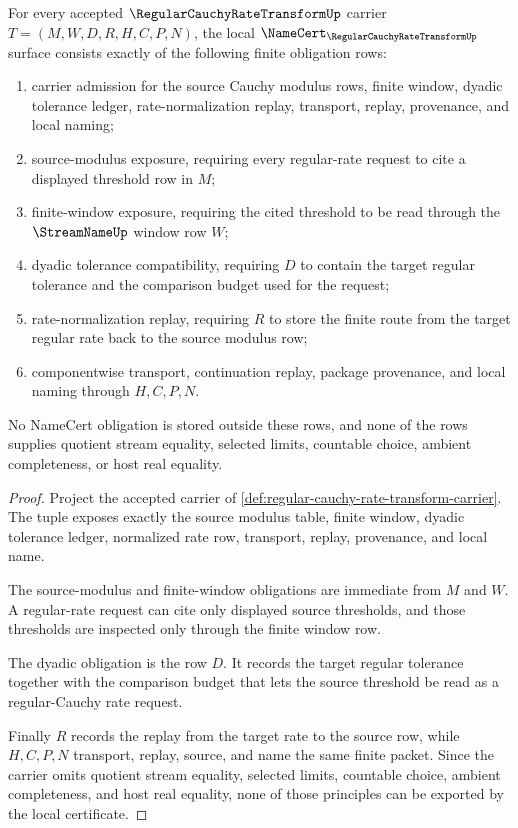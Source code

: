 \begin{theorem}
\label{thm:regular-cauchy-rate-transform-namecert-obligations}
For every accepted $\RegularCauchyRateTransformUp$ carrier $T=(M,W,D,R,H,C,P,N)$, the local $\NameCert_{\RegularCauchyRateTransformUp}$ surface consists exactly of the following finite obligation rows:
\begin{enumerate}
\item carrier admission for the source Cauchy modulus rows, finite window, dyadic tolerance ledger, rate-normalization replay, transport, replay, provenance, and local naming;
\item source-modulus exposure, requiring every regular-rate request to cite a displayed threshold row in $M$;
\item finite-window exposure, requiring the cited threshold to be read through the $\StreamNameUp$ window row $W$;
\item dyadic tolerance compatibility, requiring $D$ to contain the target regular tolerance and the comparison budget used for the request;
\item rate-normalization replay, requiring $R$ to store the finite route from the target regular rate back to the source modulus row;
\item componentwise transport, continuation replay, package provenance, and local naming through $H,C,P,N$.
\end{enumerate}
No NameCert obligation is stored outside these rows, and none of the rows supplies quotient stream equality, selected limits, countable choice, ambient completeness, or host real equality.
\end{theorem}
\begin{proof}
Project the accepted carrier of \autoref{def:regular-cauchy-rate-transform-carrier}. The tuple exposes exactly the source modulus table, finite window, dyadic tolerance ledger, normalized rate row, transport, replay, provenance, and local name.

The source-modulus and finite-window obligations are immediate from $M$ and $W$. A regular-rate request can cite only displayed source thresholds, and those thresholds are inspected only through the finite window row.

The dyadic obligation is the row $D$. It records the target regular tolerance together with the comparison budget that lets the source threshold be read as a regular-Cauchy rate request.

Finally $R$ records the replay from the target rate to the source row, while $H,C,P,N$ transport, replay, source, and name the same finite packet. Since the carrier omits quotient stream equality, selected limits, countable choice, ambient completeness, and host real equality, none of those principles can be exported by the local certificate.
\end{proof}


